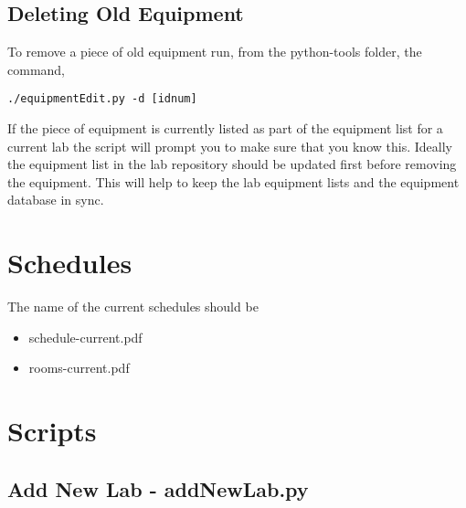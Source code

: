 \documentclass[justified]{book}
\begin{document}
\subsection{Deleting Old Equipment}

To remove a piece of old equipment run, from the python-tools folder, the command,


\begin{lstlisting}
./equipmentEdit.py -d [idnum]       
\end{lstlisting}

If the piece of equipment is currently listed as part of the equipment list for a current lab the script will prompt you to make sure that you know this. Ideally the equipment list in the lab repository should be updated first before removing the equipment. This will help to keep the lab equipment lists and the equipment database in sync. 

\section{Schedules}

\noindent The name of the current schedules should be

\begin{itemize}
\item schedule-current.pdf
\item rooms-current.pdf
\end{itemize}


\section{Scripts}

\subsection{Add New Lab - addNewLab.py}







\end{document}
